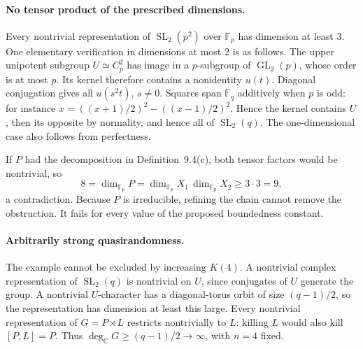 \documentclass[10pt]{article}
\begin{document}
\paragraph*{No tensor product of the prescribed dimensions.}\mbox{}\par
Every nontrivial representation of \(\operatorname{SL}_2(p^2)\) over \(\mathbb F_p\) has dimension at least \(3\). One elementary verification in dimensions at most \(2\) is as follows. The upper unipotent subgroup \(U\simeq C_p^2\) has image in a \(p\)-subgroup of \(\operatorname{GL}_2(p)\), whose order is at most \(p\). Its kernel therefore contains a nonidentity \(u(t)\). Diagonal conjugation gives all \(u(s^2t)\), \(s\ne0\). Squares span \(\mathbb F_q\) additively when \(p\) is odd: for instance \(x=((x+1)/2)^2-((x-1)/2)^2\). Hence the kernel contains \(U\), then its opposite by normality, and hence all of \(\operatorname{SL}_2(q)\). The one-dimensional case also follows from perfectness.\par
If \(P\) had the decomposition in Definition 9.4(c), both tensor factors would be nontrivial, so \[8=\dim_{\mathbb F_p}P=\dim_{\mathbb F_p}X_1\,\dim_{\mathbb F_p}X_2\ge 3\cdot3=9,\] a contradiction. Because \(P\) is irreducible, refining the chain cannot remove the obstruction. It fails for every value of the proposed boundedness constant.\par
\paragraph*{Arbitrarily strong quasirandomness.}\mbox{}\par
The example cannot be excluded by increasing \(K(4)\). A nontrivial complex representation of \(\operatorname{SL}_2(q)\) is nontrivial on \(U\), since conjugates of \(U\) generate the group. A nontrivial \(U\)-character has a diagonal-torus orbit of size \((q-1)/2\), so the representation has dimension at least this large. Every nontrivial representation of \(G=P\rtimes L\) restricts nontrivially to \(L\): killing \(L\) would also kill \([P,L]=P\). Thus \(\deg_{\mathbb C}G\ge(q-1)/2\to\infty\), with \(n=4\) fixed.\par
\end{document}
